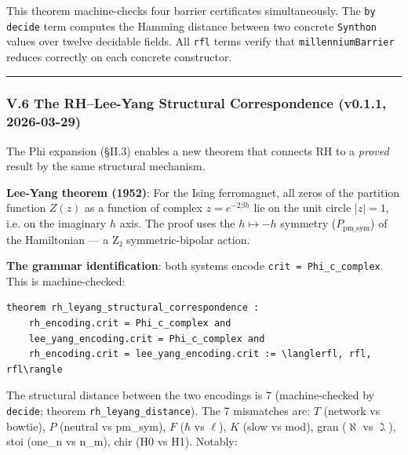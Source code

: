 \documentclass[12pt,a4paper]{article}
\newcommand{\pilcrow}{\S}
\begin{document}
This theorem machine-checks four barrier certificates simultaneously. The \texttt{by decide} term computes the Hamming distance between two concrete \texttt{Synthon} values over twelve decidable fields. All \texttt{rfl} terms verify that \texttt{millenniumBarrier} reduces correctly on each concrete constructor.

\begin{center}
\rule{0.5\textwidth}{0.4pt}
\end{center}

\subsubsection{V.6 The RH--Lee-Yang Structural Correspondence (v0.1.1, 2026-03-29)}

The Phi expansion (\pilcrow{}II.3) enables a new theorem that connects RH to a \emph{proved} result by the same structural mechanism.

\textbf{Lee-Yang theorem (1952)}: For the Ising ferromagnet, all zeros of the partition function $Z(z)$ as a function of complex $z = e^{-2\beta h}$ lie on the unit circle $|z| = 1$, i.e. on the imaginary $h$ axis. The proof uses the $h \mapsto -h$ symmetry ($P_\text{pm\_sym}$) of the Hamiltonian --- a Z₂ symmetric-bipolar action.

\textbf{The grammar identification}: both systems encode \texttt{crit = Phi\_c\_complex}. This is machine-checked:

\begin{lstlisting}[language=lean]
theorem rh_leyang_structural_correspondence :
    rh_encoding.crit = Phi_c_complex and
    lee_yang_encoding.crit = Phi_c_complex and
    rh_encoding.crit = lee_yang_encoding.crit := \langlerfl, rfl, rfl\rangle
\end{lstlisting}

The structural distance between the two encodings is 7 (machine-checked by \texttt{decide}; theorem \texttt{rh\_leyang\_distance}). The 7 mismatches are: $T$ (network vs bowtie), $P$ (neutral vs pm\_sym), $F$ ($\hbar$ vs $\ell$), $K$ (slow vs mod), gran ($\aleph$ vs $\gimel$), stoi (one\_n vs n\_m), chir (H0 vs H1). Notably:
\end{document}
